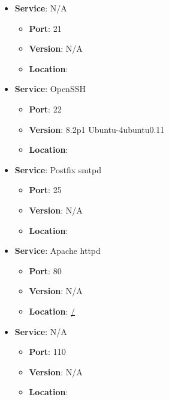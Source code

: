 \documentclass{article}
\begin{document}
\begin{itemize}
    
        \item \textbf{Service}: N/A
        \begin{itemize}
            \item \textbf{Port}: 21
            \item \textbf{Version}:  N/A 
            \item \textbf{Location}: \href{  }{  }
        \end{itemize}
    
        \item \textbf{Service}: OpenSSH
        \begin{itemize}
            \item \textbf{Port}: 22
            \item \textbf{Version}:  8.2p1 Ubuntu-4ubuntu0.11 
            \item \textbf{Location}: \href{  }{  }
        \end{itemize}
    
        \item \textbf{Service}: Postfix smtpd
        \begin{itemize}
            \item \textbf{Port}: 25
            \item \textbf{Version}:  N/A 
            \item \textbf{Location}: \href{  }{  }
        \end{itemize}
    
        \item \textbf{Service}: Apache httpd
        \begin{itemize}
            \item \textbf{Port}: 80
            \item \textbf{Version}:  N/A 
            \item \textbf{Location}: \href{ / }{ / }
        \end{itemize}
    
        \item \textbf{Service}: N/A
        \begin{itemize}
            \item \textbf{Port}: 110
            \item \textbf{Version}:  N/A 
            \item \textbf{Location}: \href{  }{  }
        \end{itemize}
    

\end{itemize}
\end{document}
